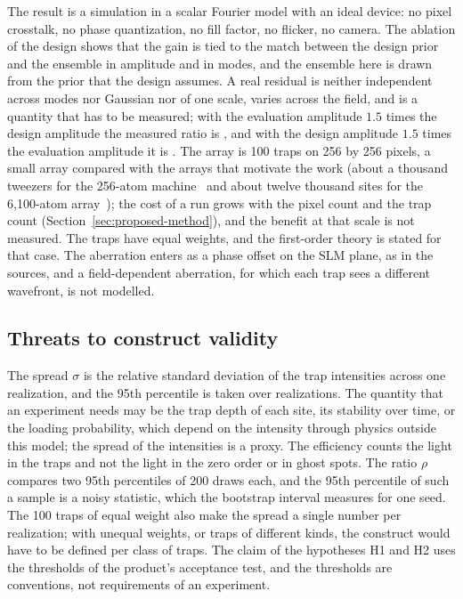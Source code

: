 The result is a simulation in a scalar Fourier model with an ideal device: no pixel crosstalk, no phase quantization, no fill factor, no flicker, no camera. The ablation of the design shows that the gain is tied to the match between the design prior and the ensemble in amplitude and in modes, and the ensemble here is drawn from the prior that the design assumes. A real residual is neither independent across modes nor Gaussian nor of one scale, varies across the field, and is a quantity that has to be measured; with the evaluation amplitude $1.5$ times the design amplitude the measured ratio is \misDMed{}, and with the design amplitude $1.5$ times the evaluation amplitude it is \ablPriorDMed. The array is 100 traps on 256 by 256 pixels, a small array compared with the arrays that motivate the work (about a thousand tweezers for the 256-atom machine~\cite{ebadi2021} and about twelve thousand sites for the 6,100-atom array~\cite{manetsch2025}); the cost of a run grows with the pixel count and the trap count (Section~\ref{sec:proposed-method}), and the benefit at that scale is not measured. The traps have equal weights, and the first-order
theory is stated for that case. The aberration enters as a phase offset on the SLM plane, as in the sources, and a field-dependent aberration, for which each trap sees a different wavefront, is not modelled.

\subsection{Threats to construct validity}

The spread $\sigma$ is the relative standard deviation of the trap intensities across one realization, and the 95th percentile is taken over realizations. The quantity that an experiment needs may be the trap depth of each site, its stability over time, or the loading probability, which depend on the intensity through physics outside this model; the spread of the intensities is a proxy. The efficiency counts the light in the traps and not the light in the zero order or in ghost spots. The ratio $\rho$ compares two 95th percentiles of 200 draws each, and
the 95th percentile of such a sample is a noisy statistic, which the bootstrap interval measures for one seed. The 100 traps of equal weight also make the spread a single number per realization; with unequal weights, or traps of different kinds, the construct would have to be defined per class of traps. The claim of the hypotheses H1 and H2 uses the thresholds of the product's acceptance test, and the thresholds are conventions, not requirements of an experiment.

